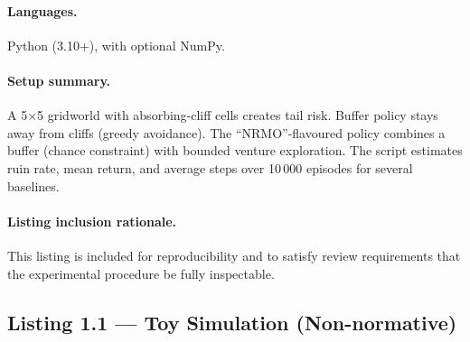 \paragraph{Languages.}
Python (3.10+), with optional NumPy.

\paragraph{Setup summary.}
A 5$\times$5 gridworld with absorbing-cliff cells creates tail risk.
Buffer policy stays away from cliffs (greedy avoidance). The
``NRMO''-flavoured policy combines a buffer (chance constraint) with
bounded venture exploration. The script estimates ruin rate, mean
return, and average steps over 10\,000 episodes for several
baselines.

\paragraph{Listing inclusion rationale.}
This listing is included for reproducibility and to satisfy review
requirements that the experimental procedure be fully inspectable.

\subsection*{Listing 1.1 --- Toy Simulation (Non-normative)}

